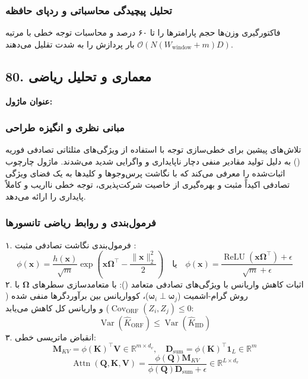 \subsubsection*{تحلیل پیچیدگی محاسباتی و ردپای حافظه}
فاکتورگیری وزن‌ها حجم پارامترها را تا ۶۰ درصد و محاسبات توجه خطی با مرتبه $\mathcal{O}(N (W_{\text{window}} + m) D)$ بار پردازش را به شدت تقلیل می‌دهند.


\subsection*{80. معماری و تحلیل ریاضی }
\textbf{عنوان ماژول:} 

\subsubsection*{مبانی نظری و انگیزه طراحی}
تلاش‌های پیشین برای خطی‌سازی توجه با استفاده از ویژگی‌های مثلثاتی تصادفی فوریه () به دلیل تولید مقادیر منفی دچار ناپایداری و واگرایی شدید می‌شدند. ماژول  چارچوب اثبات‌شده  را معرفی می‌کند که با نگاشت پرس‌وجوها و کلیدها به یک فضای ویژگی تصادفی اکیداً مثبت و بهره‌گیری از خاصیت شرکت‌پذیری، توجه خطی نااریب و کاملاً پایداری را ارائه می‌دهد.

\subsubsection*{فرمول‌بندی و روابط ریاضی تانسورها}
۱. فرمول‌بندی نگاشت تصادفی مثبت :
\begin{equation}
\phi(\mathbf{x}) = \frac{h(\mathbf{x})}{\sqrt{m}} \exp\left(\mathbf{x} \mathbf{\Omega}^\top - \frac{\|\mathbf{x}\|_2^2}{2}\right) \quad \text{یا} \quad \phi(\mathbf{x}) = \frac{\operatorname{ReLU}(\mathbf{x} \mathbf{\Omega}^\top) + \epsilon}{\sqrt{m} + \epsilon}
\end{equation}
۲. اثبات کاهش واریانس با ویژگی‌های تصادفی متعامد ():
با متعامدسازی سطرهای $\mathbf{\Omega}$ با روش گرام-اشمیت ($\mathbf{\omega}_i \perp \mathbf{\omega}_j$)، کوواریانس بین برآوردگرها منفی شده ($\operatorname{Cov}_{\text{ORF}}(Z_i, Z_j) \le 0$) و واریانس کل کاهش می‌یابد:
\begin{equation}
\operatorname{Var}\left(\hat{K}_{\text{ORF}}\right) \le \operatorname{Var}\left(\hat{K}_{\text{IID}}\right)
\end{equation}
۳. انقباض ماتریسی خطی:
\begin{equation}
\mathbf{M}_{KV} = \phi(\mathbf{K})^\top \mathbf{V} \in \mathbb{R}^{m \times d_v}, \quad \mathbf{D}_{\text{sum}} = \phi(\mathbf{K})^\top \mathbf{1}_L \in \mathbb{R}^{m}
\end{equation}
\begin{equation}
\operatorname{Attn}(\mathbf{Q}, \mathbf{K}, \mathbf{V}) = \frac{\phi(\mathbf{Q}) \mathbf{M}_{KV}}{\phi(\mathbf{Q}) \mathbf{D}_{\text{sum}} + \epsilon} \in \mathbb{R}^{L \times d_v}
\end{equation}

